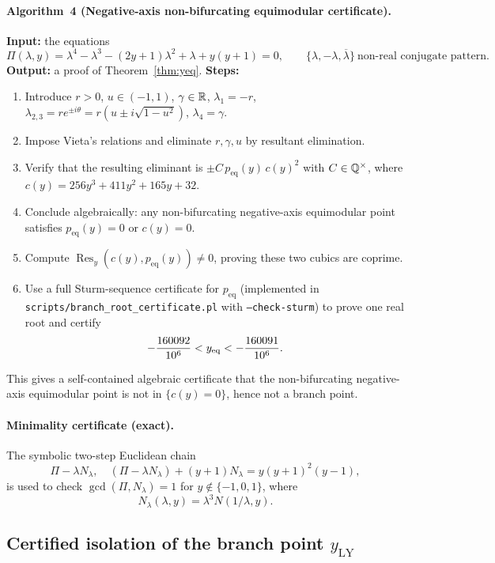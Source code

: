 \paragraph{Algorithm~4 (Negative-axis non-bifurcating equimodular certificate).}
\textbf{Input:} the equations
\[
\Pi(\lambda,y)=\lambda^4-\lambda^3-(2y+1)\lambda^2+\lambda+y(y+1)=0,\qquad
\{\lambda,-\lambda,\overline{\lambda}\}\ \text{non-real conjugate pattern}.
\]
\textbf{Output:} a proof of Theorem~\ref{thm:yeq}.
\textbf{Steps:}
\begin{enumerate}
  \item Introduce \(r>0\), \(u\in(-1,1)\), \(\gamma\in\mathbb{R}\), \(\lambda_1=-r\), \(\lambda_{2,3}=re^{\pm i\theta}=r(u\pm i\sqrt{1-u^2})\), \(\lambda_4=\gamma\).
  \item Impose Vieta's relations and eliminate \(r,\gamma,u\) by resultant elimination.
  \item Verify that the resulting eliminant is \(\pm C\,p_{\mathrm{eq}}(y)\,c(y)^2\) with \(C\in\mathbb{Q}^\times\), where
        \(c(y)=256y^3+411y^2+165y+32\).
  \item Conclude algebraically: any non-bifurcating negative-axis equimodular point satisfies \(p_{\mathrm{eq}}(y)=0\) or \(c(y)=0\).
  \item Compute \(\operatorname{Res}_y(c(y),p_{\mathrm{eq}}(y))\neq0\), proving these two cubics are coprime.
  \item Use a full Sturm-sequence certificate for \(p_{\mathrm{eq}}\) (implemented in
        \texttt{scripts/branch\_root\_certificate.pl} with \texttt{--check-sturm}) to prove one real root and certify
  \[
  -\frac{160092}{10^6}<y_{\mathrm{eq}}<-\frac{160091}{10^6}.
  \]
\end{enumerate}
This gives a self-contained algebraic certificate that the non-bifurcating negative-axis equimodular point is not in \(\{c(y)=0\}\), hence not a branch point.

\paragraph{Minimality certificate (exact).}
The symbolic two-step Euclidean chain
\[
\Pi-\lambda N_\lambda,\quad ( \Pi-\lambda N_\lambda)+(y+1)N_\lambda=y(y+1)^2(y-1),
\]
is used to check \(\gcd(\Pi,N_\lambda)=1\) for \(y\notin\{-1,0,1\}\), where
\[
N_\lambda(\lambda,y)=\lambda^3N(1/\lambda,y).
\]


\subsection{Certified isolation of the branch point \texorpdfstring{$y_{\mathrm{LY}}$}{y\_LY}}

